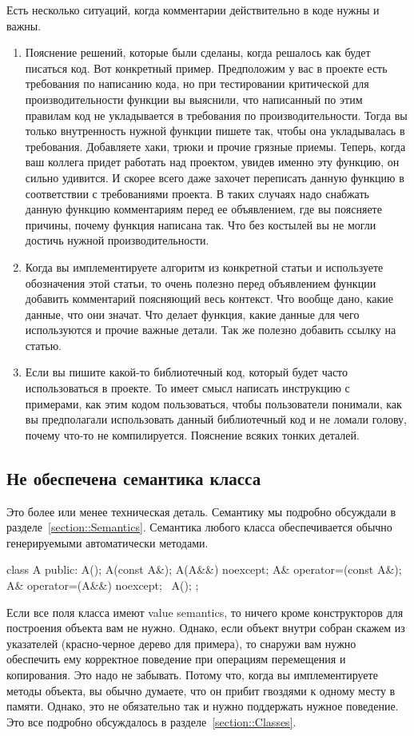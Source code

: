 Есть несколько ситуаций, когда комментарии действительно в коде нужны и важны.
\begin{enumerate}
\item Пояснение решений, которые были сделаны, когда решалось как будет писаться код.
Вот конкретный пример.
Предположим у вас в проекте есть требования по написанию кода, но при тестировании критической для производительности функции вы выяснили, что написанный по этим правилам код не укладывается в требования по производительности.
Тогда вы только внутренность нужной функции пишете так, чтобы она укладывалась в требования.
Добавляете хаки, трюки и прочие грязные приемы.
Теперь, когда ваш коллега придет работать над проектом, увидев именно эту функцию, он сильно удивится.
И скорее всего даже захочет переписать данную функцию в соответствии с требованиями проекта.
В таких случаях надо снабжать данную функцию комментариям перед ее объявлением, где вы поясняете причины, почему функция написана так.
Что без костылей вы не могли достичь нужной производительности.

\item Когда вы имплементируете алгоритм из конкретной статьи и используете обозначения этой статьи, то очень полезно перед объявлением функции добавить комментарий поясняющий весь контекст.
Что вообще дано, какие данные, что они значат.
Что делает функция, какие данные для чего используются и прочие важные детали.
Так же полезно добавить ссылку на статью.

\item Если вы пишите какой-то библиотечный код, который будет часто использоваться в проекте.
То имеет смысл написать инструкцию с примерами, как этим кодом пользоваться, чтобы пользователи понимали, как вы предполагали использовать данный библиотечный код и не ломали голову, почему что-то не компилируется.
Пояснение всяких тонких деталей.
\end{enumerate}

\subsection{Не обеспечена семантика класса}

Это более или менее техническая деталь.
Семантику мы подробно обсуждали в разделе~\ref{section::Semantics}.
Семантика любого класса обеспечивается обычно генерируемыми автоматически методами.
\begin{cppcode}
class A {
public:
  A();
  A(const A&);
  A(A&&) noexcept;
  A& operator=(const A&);
  A& operator=(A&&) noexcept;
  ~A();
};
\end{cppcode}
Если все поля класса имеют value semantics, то ничего кроме конструкторов для построения объекта вам не нужно.
Однако, если объект внутри собран скажем из указателей (красно-черное дерево для примера), то снаружи вам нужно обеспечить ему корректное поведение при операциям перемещения и копирования.
Это надо не забывать.
Потому что, когда вы имплементируете методы объекта, вы обычно думаете, что он прибит гвоздями к одному месту в памяти.
Однако, это не обязательно так и нужно поддержать нужное поведение.
Это все подробно обсуждалось в разделе~\ref{section::Classes}.
